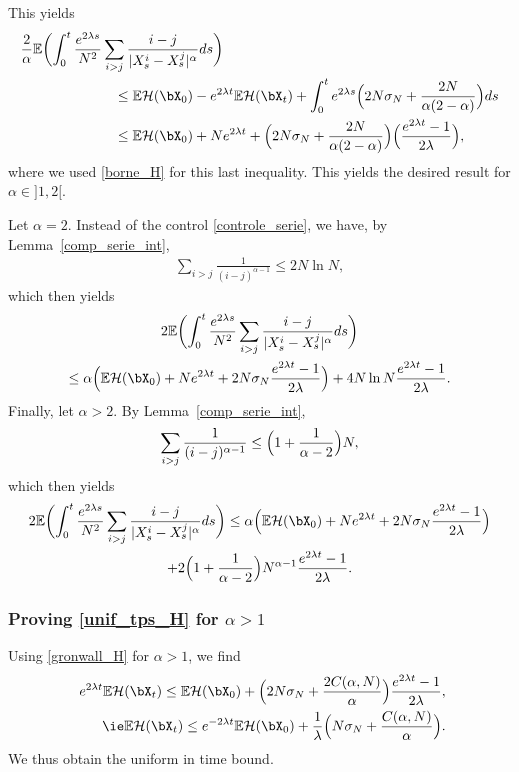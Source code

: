 This yields
\begin{align*}
\frac{2}{\alpha}\mathbb{E}\biggl(\int_0^t\frac{e^{2\lambda s}}{N^2}&\sum_{i>j}\frac{i-j}{|X^i_s-X^j_s|^{\alpha}}ds\biggr)\\
&\hspace{0.3cm}\leq\mathbb{E}\mathcal{H}(\bX_0)-e^{2\lambda t}\mathbb{E}\mathcal{H}(\bX_t)+\int_0^te^{2\lambda s}\Bigl(2N\sigma_N+\frac{2N}{\alpha(2-\alpha)}\Bigr)ds\\
&\hspace{0.3cm}\leq\mathbb{E}\mathcal{H}(\bX_0)+Ne^{2\lambda t}+\Bigl(2N\sigma_N+\frac{2N}{\alpha(2-\alpha)}\Bigr)\Bigl(\frac{e^{2\lambda t}-1}{2\lambda}\Bigr),
\end{align*}
where we used \eqref{borne_H} for this last inequality.
This yields the desired result for $\alpha\in{}]1,2[$.

Let $\alpha=2$. Instead of the control \eqref{controle_serie}, we have, by Lemma~\ref{comp_serie_int},
\begin{align*}
\sum_{i>j}\frac{1}{(i-j)^{\alpha-1}}\leq 2N\ln N,
\end{align*}
which then yields
\begin{multline*}
2\mathbb{E}\biggl(\int_0^t\frac{e^{2\lambda s}}{N^2}\sum_{i>j}\frac{i-j}{|X^i_s-X^j_s|^{\alpha}}ds\biggr)
\\
\leq \alpha\Bigl(\mathbb{E}\mathcal{H}(\bX_0)+Ne^{2\lambda t}+2N\sigma_N \frac{e^{2\lambda t}-1}{2\lambda}\Bigr)+4N\ln N\frac{e^{2\lambda t}-1}{2\lambda}.\\
\end{multline*}
Finally, let $\alpha>2$. By Lemma~\ref{comp_serie_int},
\begin{align*}
\sum_{i>j}\frac{1}{(i-j)^{\alpha-1}}\leq \Bigl(1+\frac{1}{\alpha-2}\Bigr)N,
\end{align*}
which then yields
\begin{multline*}
2\mathbb{E}\biggl(\int_0^t\frac{e^{2\lambda s}}{N^2}\sum_{i>j}\frac{i-j}{|X^i_s-X^j_s|^{\alpha}}ds\biggr)\leq\alpha\Bigl(\mathbb{E}\mathcal{H}(\bX_0)+Ne^{2\lambda t}+2N\sigma_N \frac{e^{2\lambda t}-1}{2\lambda}\Bigr)\\
+2\Bigl(1+\frac{1}{\alpha-2}\Bigr)N^{\alpha-1}\frac{e^{2\lambda t}-1}{2\lambda}.
\end{multline*}

\subsubsection*{Proving \eqref{unif_tps_H} for $\alpha>1$} Using \eqref{gronwall_H} for $\alpha>1$, we find
\begin{align*}
e^{2\lambda t}\mathbb{E}\mathcal{H}(\bX_t)\leq\mathbb{E}\mathcal{H}(\bX_0)+\Bigl(2N\sigma_N+\frac{2C(\alpha,N)}{\alpha}\Bigr)\frac{e^{2\lambda t}-1}{2\lambda },
\\
\tag*{\ie}
\mathbb{E}\mathcal{H}(\bX_t)\leq e^{-2\lambda t}\mathbb{E}\mathcal{H}(\bX_0)+\frac{1}{\lambda }\Bigl(N\sigma_N+\frac{C(\alpha,N)}{\alpha}\Bigr).
\end{align*}
We thus obtain the uniform in time bound.


